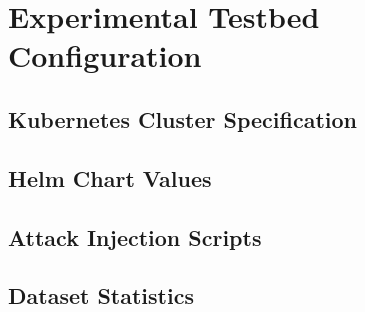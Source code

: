 \appendix
\chapter{Experimental Testbed Configuration}
\label{app:testbed}


\section{Kubernetes Cluster Specification}
\section{Helm Chart Values}
\section{Attack Injection Scripts}
\section{Dataset Statistics}

